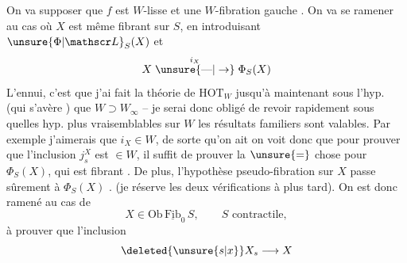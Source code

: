 
On va supposer  que $f$ est $W$-lisse et une $W$-fibration gauche . On va se ramener au cas où $X$ est même fibrant sur $S$, en introduisant $\unsure{\Phi|\mathscr L}_S(X)$ et
\[
X\mathrel{\overset{i_X}{\unsure{\text{---}|\to}}}\Phi_S(X)
\]
L'ennui, c'est que j'ai fait la théorie de $\mathrm{HOT}_W$ jusqu'à maintenant sous l'hyp. (qui s'avère ) que $W\supset W_\infty$ -- je serai donc obligé de revoir rapidement sous quelles hyp. plus vraisemblables sur $W$ les résultats familiers sont valables.  Par exemple j'aimerais que $i_X\in W$, de sorte qu'on ait
on voit donc que pour prouver que l'inclusion $j_s^X$ est $\in W$, il suffit de prouver la $\unsure{=}$ chose pour $\Phi_S(X)$, qui est fibrant . De plus, l'hypothèse pseudo-fibration sur $X$ passe sûrement à $\Phi_S(X)$ . (je réserve les deux vérifications à plus tard).
On est donc ramené au cas  de
\[
X\in\mathrm{Ob}\,\underline{\mathrm{Fib}}_0\, S,\qquad S\text{ contractile},
\]
à prouver que l'inclusion
\[
\deleted{\unsure{s|x}}X_s\longrightarrow X
\]


